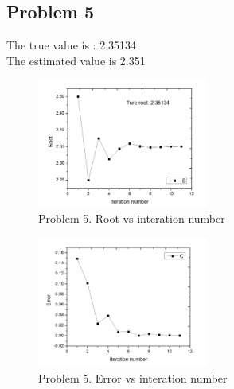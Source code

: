 \documentclass{article}
\begin{document}
\subsection*{{Problem 5}}
\label{}
The true value is : 2.35134\\
The estimated value is 2.351
 \begin{figure}
 \centering 
 \includegraphics[width=0.5\textwidth]{root}
 \caption{Problem 5. Root vs interation number} 
 \end{figure} 
  \begin{figure}
  \centering 
 \includegraphics[width=0.5\textwidth]{error}
  \caption{Problem 5. Error vs interation number} 
 \end{figure} 


\hypertarget{problem_6_homework_checklist_2}{}
\end{document}
